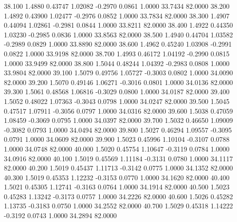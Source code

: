   38.100   1.4880   0.43747   1.02082  -0.2970   0.0861   1.0000  33.7434  82.0000
  38.200   1.4892   0.43900   1.02477  -0.2976   0.0852   1.0000  33.7834  82.0000
  38.300   1.4907   0.44094   1.02861  -0.2981   0.0844   1.0000  33.8211  82.0000
  38.400   1.4922   0.44350   1.03230  -0.2985   0.0836   1.0000  33.8563  82.0000
  38.500   1.4940   0.44704   1.03582  -0.2989   0.0829   1.0000  33.8890  82.0000
  38.600   1.4962   0.45240   1.03908  -0.2991   0.0822   1.0000  33.9198  82.0000
  38.700   1.4993   0.46172   1.04192  -0.2990   0.0815   1.0000  33.9499  82.0000
  38.800   1.5044   0.48244   1.04392  -0.2983   0.0808   1.0000  33.9804  82.0000
  39.100   1.5079   0.49756   1.05727  -0.3003   0.0802   1.0000  34.0090  82.0000
  39.200   1.5070   0.49146   1.06271  -0.3016   0.0801   1.0000  34.0136  82.0000
  39.300   1.5061   0.48568   1.06816  -0.3029   0.0800   1.0000  34.0187  82.0000
  39.400   1.5052   0.48022   1.07363  -0.3043   0.0798   1.0000  34.0247  82.0000
  39.500   1.5045   0.47517   1.07911  -0.3056   0.0797   1.0000  34.0316  82.0000
  39.600   1.5038   0.47059   1.08459  -0.3069   0.0795   1.0000  34.0397  82.0000
  39.700   1.5032   0.46650   1.09009  -0.3082   0.0793   1.0000  34.0494  82.0000
  39.800   1.5027   0.46294   1.09557  -0.3095   0.0791   1.0000  34.0609  82.0000
  39.900   1.5023   0.45996   1.10104  -0.3107   0.0788   1.0000  34.0748  82.0000
  40.000   1.5020   0.45754   1.10647  -0.3119   0.0784   1.0000  34.0916  82.0000
  40.100   1.5019   0.45569   1.11184  -0.3131   0.0780   1.0000  34.1117  82.0000
  40.200   1.5019   0.45437   1.11713  -0.3142   0.0775   1.0000  34.1352  82.0000
  40.300   1.5019   0.45353   1.12232  -0.3153   0.0770   1.0000  34.1620  82.0000
  40.400   1.5021   0.45305   1.12741  -0.3163   0.0764   1.0000  34.1914  82.0000
  40.500   1.5023   0.45283   1.13242  -0.3173   0.0757   1.0000  34.2226  82.0000
  40.600   1.5026   0.45282   1.13735  -0.3183   0.0750   1.0000  34.2552  82.0000
  40.700   1.5029   0.45318   1.14222  -0.3192   0.0743   1.0000  34.2894  82.0000
